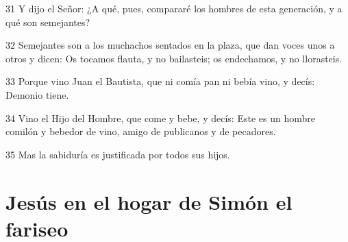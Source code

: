 \par 31 Y dijo el Señor: ¿A qué, pues, compararé los hombres de esta generación, y a qué son semejantes?
\par 32 Semejantes son a los muchachos sentados en la plaza, que dan voces unos a otros y dicen: Os tocamos flauta, y no bailasteis; os endechamos, y no llorasteis.
\par 33 Porque vino Juan el Bautista, que ni comía pan ni bebía vino, y decís: Demonio tiene.
\par 34 Vino el Hijo del Hombre, que come y bebe, y decís: Este es un hombre comilón y bebedor de vino, amigo de publicanos y de pecadores.
\par 35 Mas la sabiduría es justificada por todos sus hijos.

\section*{Jesús en el hogar de Simón el fariseo}

